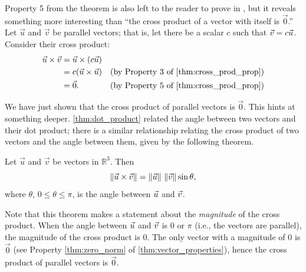 Property 5 from the theorem is also left to the reader to prove in , but it reveals something more interesting than ``the cross product of a vector with itself is $\vec 0$.'' Let $\vec u$ and $\vec v$ be parallel vectors; that is, let there be a scalar $c$ such that $\vec v = c\vec u$. Consider their cross product:
\begin{align*}
	\vec u\times\vecv
	&= \vecu \times (c\vec u) \\
	&= c(\vec u\times\vec u) & \text{(by Property 3 of \autoref{thm:cross_prod_prop})} \\
	&= \vec 0. & \text{(by Property 5 of \autoref{thm:cross_prod_prop})}
\end{align*}

We have just shown that the cross product of parallel vectors is $\vec 0$. This hints at something deeper. \autoref{thm:dot_product} related the angle between two vectors and their dot product; there is a similar relationship relating the cross product of two vectors and the angle between them, given by the following theorem.

\begin{theorem}\label{thm:cross_product}%
Let $\vec u$ and $\vec v$ be vectors in $\mathbb{R}^3$. Then
\[\left\lVert \vec u\times\vec v \right\rVert = \left\lVert \vec u \right\rVert\, \left\lVert \vec v \right\rVert \sin\theta,\]
where $\theta$, $0\leq \theta \leq \pi$, is the angle between $\vec u$ and $\vec v$.
\end{theorem}


Note that this theorem makes a statement about the \emph{magnitude} of the cross product. When the angle between $\vec u$ and $\vec v$ is 0 or $\pi$ (i.e., the vectors are parallel), the magnitude of the cross product is 0. The only vector with a magnitude of 0 is $\vec 0$ (see Property \ref{thm:zero_norm} of \autoref{thm:vector_properties}), hence the cross product of  parallel vectors is $\vec 0$.\bigskip

